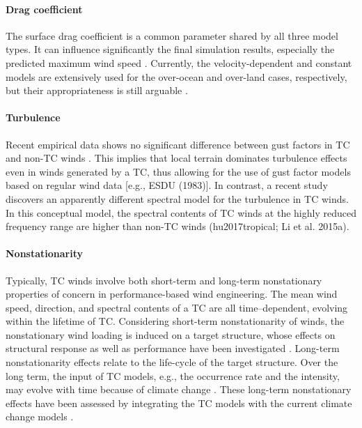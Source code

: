 \paragraph{Drag coefficient} The surface drag coefficient is a common parameter shared by all three model types. It can influence significantly the final simulation results, especially the predicted maximum wind speed \citep{li2015observations, powell2003reduced}. Currently, the velocity-dependent and constant models are extensively used for the over-ocean and over-land cases, respectively, but their appropriateness is still arguable \citep{smith2014sensitivity}. 

\paragraph{Turbulence} Recent empirical data shows no significant difference between gust factors in TC and non-TC winds \citep{vickery2009hurricane-a}. This implies that local terrain dominates turbulence effects even in winds generated by a TC, thus allowing for the use of gust factor models based on regular wind data [e.g., ESDU (1983)]. In contrast, a recent study discovers an apparently different spectral model for the turbulence in TC winds. In this conceptual model, the spectral contents of TC winds at the highly reduced frequency range are higher than non-TC winds (hu2017tropical; Li et al. 2015a).

\paragraph{Nonstationarity} Typically, TC winds involve both short-term and long-term nonstationary properties of concern in performance-based wind engineering. The mean wind speed, direction, and spectral contents of a TC are all time–dependent, evolving within the lifetime of TC. Considering short-term nonstationarity of winds, the nonstationary wind loading is induced on a target structure, whose effects on structural response as well as performance have been investigated \citep{kareem2018generalized, kwon2009gustfront, yau2011hurricane}. Long-term nonstationarity effects relate to the life-cycle of the target structure. Over the long term, the input of TC models, e.g., the occurrence rate and the intensity, may evolve with time because of climate change \citep{emanuel2005increasing}. These long-term nonstationary effects have been assessed by integrating the TC models with the current climate change models \citep{emanuel2008hurricanes,lauren2014assessing,lin2015integrated,liu2014projections}.

